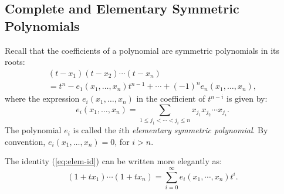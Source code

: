 \documentclass[11pt]{amsproc}
\theoremstyle{definition}
\theoremstyle{example}
\begin{document}
\subsection{Complete and Elementary Symmetric Polynomials}
\label{sec:compl-elem-symm}
Recall that the coefficients of a polynomial are symmetric polynomials in its roots:
\begin{multline}
  \label{eq:elem-id}
  (t-x_1)(t-x_2)\dotsb (t-x_n) \\= t^n - e_1(x_1,\dotsc, x_n)t^{n-1} + \dotsb + (-1)^n e_n(x_1,\dotsc, x_n),
\end{multline}
where the expression $e_i(x_1,\dotsc, x_n)$ in the coefficient of $t^{n-i}$ is given by:
\begin{equation}
  \label{eq:elem}
  e_i(x_1,\dotsc, x_n) = \sum_{1\leq j_1<\dotsb<j_i\leq n} x_{j_1}x_{j_2}\dotsb x_{j_i}.
\end{equation}
The polynomial $e_i$ is called the $i$th \emph{elementary symmetric polynomial}.
By convention, $e_i(x_1,\dotsc,x_n)=0$, for $i>n$.

The identity (\ref{eq:elem-id}) can be written more elegantly as:
\begin{displaymath}
  (1+t x_1) \dotsb (1+tx_n) = \sum_{i=0}^\infty e_i(x_1,\dotsb, x_n)t^i.
\end{displaymath}
\end{document}
